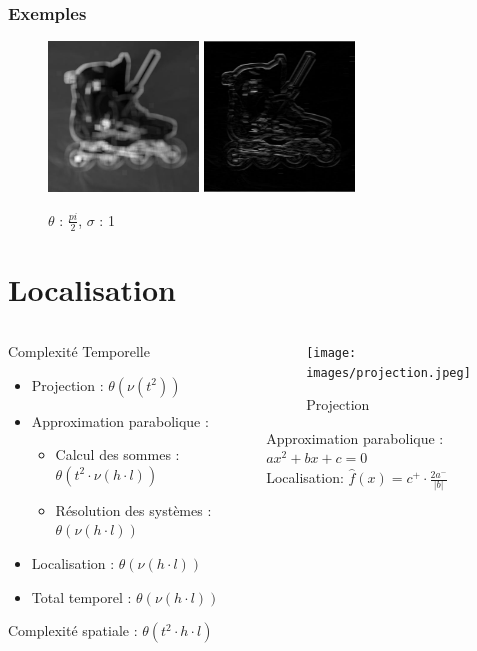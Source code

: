 \documentclass[french]{beamer}
\begin{document}
\begin{frame}
	\frametitle{Exemples}
	\begin{figure}[!h]
		\centering
		\includegraphics[width=4cm]{images/roller_resp.jpg} \; \includegraphics[width = 4cm]{images/roller_filtered.jpg}
		\caption{$\theta$ : $\frac{pi}{2}$, $\sigma$ : 1}
	\end{figure}
\end{frame}

\section{Localisation}

\begin{frame}
	\begin{columns}
		\begin{column}{5cm}
			Complexité Temporelle
			\begin{itemize}
				\item Projection : $\theta(\nu(t^2))$
				\item Approximation parabolique :
					\begin{itemize}
						\item Calcul des sommes : $\theta(t^2 \cdot \nu(h \cdot l))$
						\item Résolution des systèmes : $\theta(\nu(h \cdot l))$
					\end{itemize}
				\item Localisation : $\theta(\nu(h \cdot l))$
				\item Total temporel : $\theta(\nu(h \cdot l))$
			\end{itemize}
			Complexité spatiale : $\theta(t^2 \cdot h \cdot l)$
		\end{column}
		\begin{column}{5cm}
			\begin{figure}[!h]
				\texttt{[image: images/projection.jpeg]}
				\caption{Projection}
			\end{figure}
			Approximation parabolique : $ax^2 + bx + c = 0$\\
			Localisation: $\hat{f}(x) = c^+ \cdot \frac{2a^-}{|b|}$
		\end{column}
	\end{columns}
\end{frame}
\end{document}
